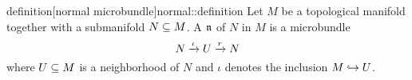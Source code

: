 \begin{mystatement}{definition}[normal microbundle]{normal::definition}
    Let $M$ be a topological manifold together with a submanifold $N \subseteq{} M$.
    A  $\mathfrak{n}$ of $N$ in $M$ is a microbundle
    \[ N \xrightarrow{\iota} U \xrightarrow{r} N{} \]
    where $U \subseteq{} M$ is a neighborhood of $N$ and $\iota$ denotes the inclusion $M \hookrightarrow{} U$.
\end{mystatement}
